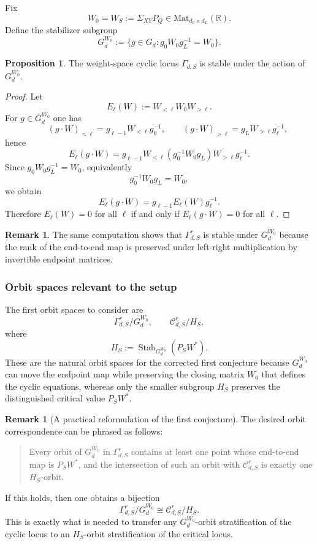 \documentclass{article}
\newcommand{\Mat}{\mathrm{Mat}}
\newcommand{\Stab}{\operatorname{Stab}}
\theoremstyle{definition}
\newtheorem{proposition}[theorem]{Proposition}
\newtheorem{remark}[theorem]{Remark}
\begin{document}
Fix
\[
W_0=W_S:=\Sigma_{XY}P_Q\in \Mat_{d_0\times d_L}(\mathbb R).
\]
Define the stabilizer subgroup
\[
G_d^{W_0}
:=
\{g\in G_d : g_0W_0 g_L^{-1}=W_0\}.
\]

\begin{proposition}
The weight-space cyclic locus $\Gamma_{d,S}$ is stable under the action of $G_d^{W_0}$.
\end{proposition}

\begin{proof}
Let
\[
E_\ell(W):=W_{<\ell}W_0W_{>\ell}.
\]
For $g\in G_d^{W_0}$ one has
\[
\qquad
(g\cdot W)_{<\ell}=g_{\ell-1}W_{<\ell}g_0^{-1},
\qquad
(g\cdot W)_{>\ell}=g_LW_{>\ell}g_\ell^{-1},
\]
hence
\[
E_\ell(g\cdot W)
=
g_{\ell-1}W_{<\ell}(g_0^{-1}W_0g_L)W_{>\ell}g_\ell^{-1}.
\]
Since $g_0W_0g_L^{-1}=W_0$, equivalently
\[
g_0^{-1}W_0g_L=W_0,
\]
we obtain
\[
E_\ell(g\cdot W)=g_{\ell-1}E_\ell(W)g_\ell^{-1}.
\]
Therefore $E_\ell(W)=0$ for all $\ell$ if and only if $E_\ell(g\cdot W)=0$ for all $\ell$.
\end{proof}

\begin{remark}
The same computation shows that $\Gamma_{d,S}^r$ is stable under $G_d^{W_0}$ because the rank of the end-to-end map is preserved under left-right multiplication by invertible endpoint matrices.
\end{remark}

\subsubsection*{Orbit spaces relevant to the setup}

The first orbit spaces to consider are
\[
\Gamma_{d,S}^r / G_d^{W_0},
\qquad
\mathcal C_{d,S}^r / H_S,
\]
where
\[
H_S:=\Stab_{G_d^{W_0}}(P_SW^\ast).
\]
These are the natural orbit spaces for the corrected first conjecture because $G_d^{W_0}$ can move the endpoint map while preserving the closing matrix $W_0$ that defines the cyclic equations, whereas only the smaller subgroup $H_S$ preserves the distinguished critical value $P_SW^\ast$.

\begin{remark}[A practical reformulation of the first conjecture]
The desired orbit correspondence can be phrased as follows:
\begin{quote}
Every orbit of $G_d^{W_0}$ in $\Gamma_{d,S}^r$ contains at least one point whose end-to-end map is $P_SW^\ast$, and the intersection of such an orbit with $\mathcal C_{d,S}^r$ is exactly one $H_S$-orbit.
\end{quote}
If this holds, then one obtains a bijection
\[
\Gamma_{d,S}^r / G_d^{W_0}
\cong
\mathcal C_{d,S}^r / H_S.
\]
This is exactly what is needed to transfer any $G_d^{W_0}$-orbit stratification of the cyclic locus to an $H_S$-orbit stratification of the critical locus.
\end{remark}
\end{document}
